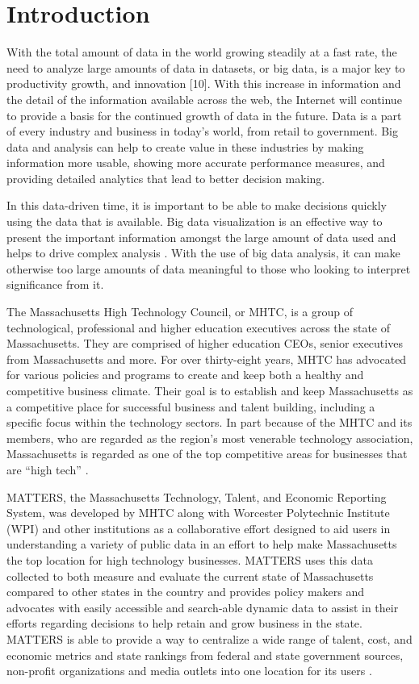\chapter{Introduction}

	With the total amount of data in the world growing steadily at a fast rate, 
	the need to analyze large amounts of data in datasets, or big data, is a major 
	key to productivity growth, and innovation [10]. With this increase in 
	information and the detail of the information available across the web, 
	the Internet will continue to provide a basis for the continued growth of 
	data in the future. Data is a part of every industry and business in today's 
	world, from retail to government. Big data and analysis can help to create
	 value in these industries by making information more usable, showing more 
	 accurate performance measures, and providing detailed analytics that 
	 lead to better decision making.

	In this data-driven time, it is important to be able to make decisions 
	quickly using the data that is available. Big data visualization is an 
	effective way to present the important information amongst the large amount 
	of data used and helps to drive complex analysis \cite{bigdata}. With the use of big 
	data analysis, it can make otherwise too large amounts of data meaningful 
	to those who looking to interpret significance from it.

	The Massachusetts High Technology Council, or MHTC, is a group of technological, 
	professional and higher education executives across the state of Massachusetts. 
	They are comprised of higher education CEOs, senior executives from Massachusetts 
	and more. For over thirty-eight years, MHTC has advocated for various policies 
	and programs to create and keep both a healthy and competitive business climate. 
	Their goal is to establish and keep Massachusetts as a competitive place for 
	successful business and talent building, including a specific focus within the 
	technology sectors. In part because of the MHTC and its members, who are 
	regarded as the region's most venerable technology association, Massachusetts 
	is regarded as one of the top competitive areas for businesses that are “high tech” \cite{mhtc}.

	MATTERS, the Massachusetts Technology, Talent, and Economic Reporting System, 
	was developed by MHTC along with Worcester Polytechnic Institute (WPI) and other 
	institutions as a collaborative effort designed to aid users in understanding a 
	variety of public data in an effort to help make Massachusetts the top location 
	for high technology businesses. MATTERS uses this data collected to both measure 
	and evaluate the current state of Massachusetts compared to other states in the 
	country and provides policy makers and advocates with easily accessible and search-able 
	dynamic data to assist in their efforts regarding decisions to help  retain and 
	grow business in the state. MATTERS is able to provide a way to centralize a wide 
	range of talent, cost, and economic metrics and state rankings from federal and 
	state government sources, non-profit organizations and media outlets into one 
	location for its users \cite{about}. 

